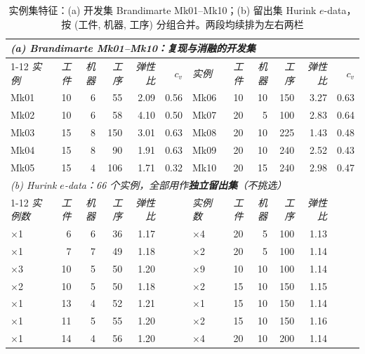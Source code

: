 \begin{table}[htbp]
  \centering
  \caption{实例集特征：(a) 开发集 Brandimarte Mk01--Mk10；(b) 留出集 Hurink $e$-data，按 (工件, 机器, 工序) 分组合并。两段均续排为左右两栏}
  \label{tab:instances}
  \footnotesize
  {\setlength{\tabcolsep}{4pt}%
  \begin{tabular}{lrrrrr@{\hspace{10pt}}lrrrrr}
    \toprule
    \multicolumn{12}{l}{\textit{(a) Brandimarte Mk01--Mk10：复现与消融的开发集}}\\
    \cmidrule(lr){1-12}
    \textit{实例} & \textit{工件} & \textit{机器} & \textit{工序} & \textit{弹性比} & \textit{$c_v$} & \textit{实例} & \textit{工件} & \textit{机器} & \textit{工序} & \textit{弹性比} & \textit{$c_v$} \\
    \midrule
    Mk01 & 10 & 6 & 55 & 2.09 & 0.56 & Mk06 & 10 & 10 & 150 & 3.27 & 0.63 \\
    Mk02 & 10 & 6 & 58 & 4.10 & 0.50 & Mk07 & 20 & 5 & 100 & 2.83 & 0.64 \\
    Mk03 & 15 & 8 & 150 & 3.01 & 0.63 & Mk08 & 20 & 10 & 225 & 1.43 & 0.48 \\
    Mk04 & 15 & 8 & 90 & 1.91 & 0.63 & Mk09 & 20 & 10 & 240 & 2.52 & 0.43 \\
    Mk05 & 15 & 4 & 106 & 1.71 & 0.32 & Mk10 & 20 & 15 & 240 & 2.98 & 0.47 \\
    \midrule
    \multicolumn{12}{l}{\textit{(b) Hurink $e$-data：66 个实例，全部用作\textbf{独立留出集}（不挑选）}}\\
    \cmidrule(lr){1-12}
    \textit{实例数} & \textit{工件} & \textit{机器} & \textit{工序} & \textit{弹性比} & \textit{} & \textit{实例数} & \textit{工件} & \textit{机器} & \textit{工序} & \textit{弹性比} & \textit{} \\
    $\times$1 & 6 & 6 & 36 & 1.17 & & $\times$4 & 20 & 5 & 100 & 1.13 & \\
    $\times$1 & 7 & 7 & 49 & 1.18 & & $\times$2 & 20 & 5 & 100 & 1.14 & \\
    $\times$3 & 10 & 5 & 50 & 1.20 & & $\times$9 & 10 & 10 & 100 & 1.14 & \\
    $\times$2 & 10 & 5 & 50 & 1.18 & & $\times$2 & 15 & 10 & 150 & 1.15 & \\
    $\times$1 & 13 & 4 & 52 & 1.21 & & $\times$1 & 15 & 10 & 150 & 1.14 & \\
    $\times$1 & 11 & 5 & 55 & 1.20 & & $\times$2 & 15 & 10 & 150 & 1.16 & \\
    $\times$1 & 14 & 4 & 56 & 1.20 & & $\times$4 & 20 & 10 & 200 & 1.14 & \\

\end{tabular}}
\end{table}
